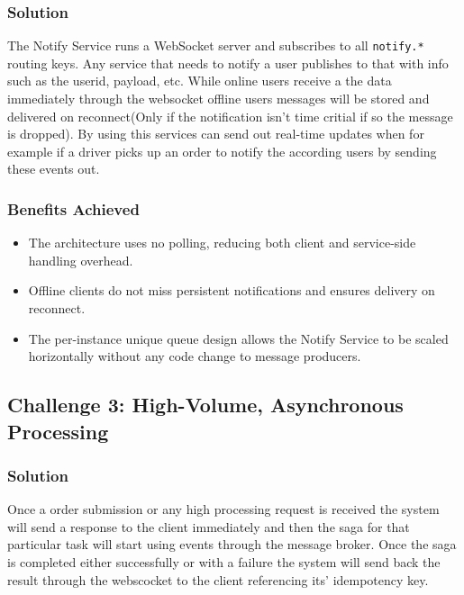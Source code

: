 \subsubsection{Solution}

The Notify Service runs a WebSocket server and subscribes to all \texttt{notify.*} routing keys. Any service that needs to notify a user publishes to that with info such as the userid, payload, etc. While online users receive a the data immediately through the websocket offline users messages will be stored and delivered on reconnect(Only if the notification isn't time critial if so the message is dropped). By using this services can send out real-time updates when for example if a driver picks up an order to notify the according users by sending these events out.

\subsubsection{Benefits Achieved}

\begin{itemize}
    \item The architecture uses no polling, reducing both client and service-side handling overhead.
    \item Offline clients do not miss persistent notifications and ensures delivery on reconnect.
    \item The per-instance unique queue design allows the Notify Service to be scaled horizontally without any code change to message producers.
\end{itemize}

\subsection{Challenge 3: High-Volume, Asynchronous Processing}

\subsubsection{Solution}

Once a order submission or any high processing request is received the system will send a response to the client immediately and then the saga for that particular task will start using events through the message broker. Once the saga is completed either successfully or with a failure the system will send back the result through the webscocket to the client referencing its' idempotency key.

